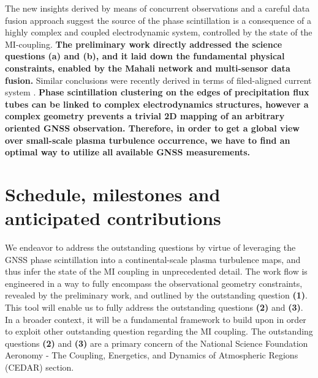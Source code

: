 \documentclass[letterpaper,12pt]{article}
\begin{document}
The new insights derived by means of concurrent observations and a careful data fusion approach suggest the source of the phase scintillation is a consequence of a highly complex and coupled electrodynamic system, controlled by the state of the MI-coupling. \textbf{The preliminary work directly addressed the science questions (a) and (b), and it laid down the fundamental physical constraints, enabled by the Mahali network and multi-sensor data fusion.} Similar conclusions were recently derived in terms of filed-aligned current system \citep{McGranaghan2017, Prikryl2016}. \textbf{Phase scintillation clustering on the edges of precipitation flux tubes can be linked to complex electrodynamics structures, however a complex geometry prevents a trivial 2D mapping of an arbitrary oriented GNSS observation. Therefore, in order to get a global view over small-scale plasma turbulence occurrence, we have to find an optimal way to utilize all available GNSS measurements.}

\vspace{-0.5em}
\section{Schedule, milestones and anticipated contributions}

We endeavor to address the outstanding questions by virtue of leveraging the GNSS phase scintillation into a continental-scale plasma turbulence maps, and thus infer the state of the MI coupling in  unprecedented detail. The work flow is engineered in a way to fully encompass the observational geometry constraints, revealed by the preliminary work, and outlined by the outstanding question \textbf{(1)}. This tool will enable us to fully address the outstanding questions \textbf{(2)} and \textbf{(3)}. In a broader context, it will be a fundamental framework to build upon in order to exploit other outstanding question regarding the MI coupling. The outstanding questions \textbf{(2)} and \textbf{(3)} are a primary concern of the National Science Foundation Aeronomy - The Coupling, Energetics, and Dynamics of Atmospheric Regions (CEDAR) section.
\end{document}
